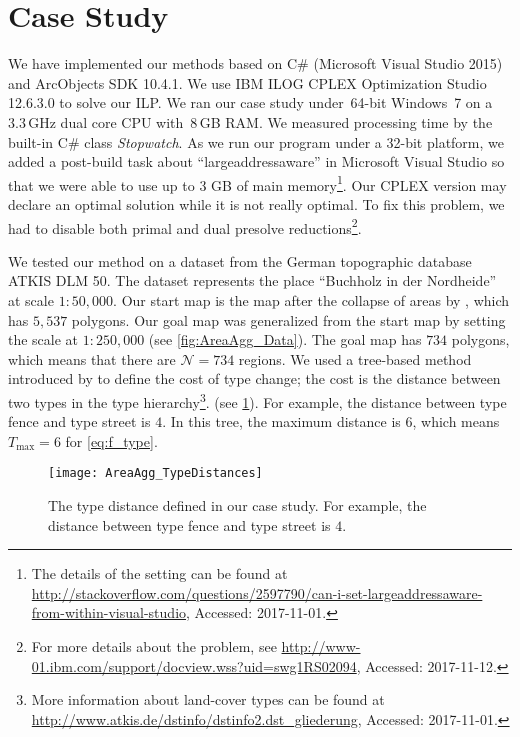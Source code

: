 \section{Case Study}
\label{sec:AreaAgg_CaseStudy}
We have implemented our methods 
based on C\# (Microsoft Visual Studio 2015) 
and ArcObjects SDK 10.4.1.
We use IBM ILOG
CPLEX Optimization Studio 12.6.3.0 to solve our ILP. 
We ran our case study under~64-bit 
Windows~7 on a~$3.3\,$GHz dual core CPU with~$8\,$GB RAM.
We measured processing time 
by the built-in C\# class \emph{Stopwatch}.
As we run our program under a 32-bit platform, 
we added a post-build task about ``largeaddressaware''
in Microsoft Visual Studio
so that we were able to use up to 3 GB of main memory\footnote{
The details of the setting can be found at 	
\url{http://stackoverflow.com/questions/2597790/can-i-set-largeaddressaware-from-within-visual-studio},
Accessed: 2017-11-01.}.
Our CPLEX  version may declare an optimal solution
while it is not really optimal.
To fix this problem, we had to disable 
both primal and dual presolve reductions\footnote{
For more details about the problem, see
\url{http://www-01.ibm.com/support/docview.wss?uid=swg1RS02094},
Accessed: 2017-11-12.}.

We tested our method on a dataset 
from the German topographic database ATKIS DLM 50. 
The dataset represents the place 
``Buchholz in der Nordheide'' at scale $1:50{,}000$. 
Our start map is the map after the collapse of areas 
by \citet[pp.~61--66]{haunert2008f}, 
which has $5{,}537$ polygons. 
Our goal map was generalized from the start map 
by \citet{HaunertWolff2010AreaAgg} setting the scale 
at $1:250{,}000$ (see \fig\ref{fig:AreaAgg_Data}). 
The goal map has $734$ polygons, 
which means that there are $\mathcal{N}=734$ regions.  
%
We used a tree-based method introduced by \citet{Schwering2008} 
to define the cost of type change; 
the cost is the distance 
between two types in the type hierarchy\footnote{
More information about land-cover types can be found at 
\url{http://www.atkis.de/dstinfo/dstinfo2.dst_gliederung},
Accessed: 2017-11-01.}. 
(see \fig\ref{fig:AreaAgg_TypeDistances}). 
For example, the distance 
between type fence and type street is $4$.
In this tree, the maximum distance is $6$, 
which means $T_\mathrm{max}=6$ for \eq\ref{eq:f_type}.  

\begin{figure}[tb]
	\centering
	\texttt{[image: AreaAgg\_TypeDistances]}
	\caption{The type distance defined in our case study. 
		For example, the distance 
		between type fence and type street is $4$.}
	\label{fig:AreaAgg_TypeDistances}
\end{figure}

